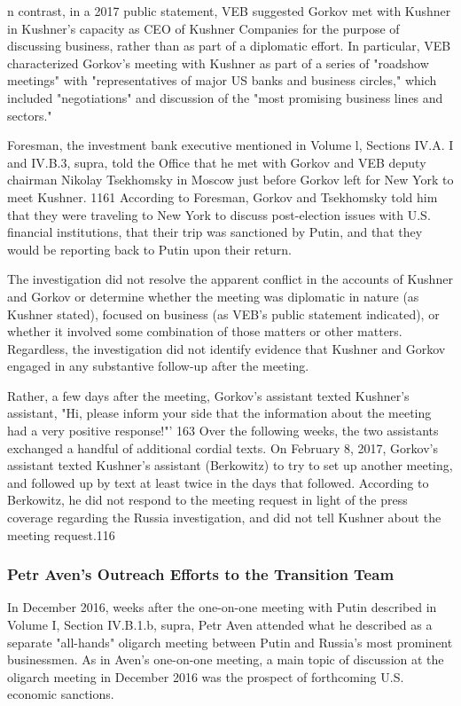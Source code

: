 n contrast, in a 2017 public statement, VEB suggested Gorkov met with Kushner in Kushner's capacity as CEO of Kushner Companies for the purpose of discussing business, rather than as part of a diplomatic effort. In particular, VEB characterized Gorkov's meeting with Kushner as part of a series of "roadshow meetings" with "representatives of major US banks and business circles," which included "negotiations" and discussion of the "most promising business lines and sectors."%

Foresman, the investment bank executive mentioned in Volume l, Sections IV.A. I and IV.B.3, supra, told the Office that he met with Gorkov and VEB deputy chairman Nikolay Tsekhomsky in Moscow just before Gorkov left for New York to meet Kushner. 1161 According to Foresman, Gorkov and Tsekhomsky told him that they were traveling to New York to discuss post-election issues with U.S. financial institutions, that their trip was sanctioned by Putin, and that they would be reporting back to Putin upon their return.%

The investigation did not resolve the apparent conflict in the accounts of Kushner and Gorkov or determine whether the meeting was diplomatic in nature (as Kushner stated), focused on business (as VEB's public statement indicated), or whether it involved some combination of those matters or other matters. Regardless, the investigation did not identify evidence that Kushner and Gorkov engaged in any substantive follow-up after the meeting.

Rather, a few days after the meeting, Gorkov's assistant texted Kushner's assistant, "Hi, please inform your side that the information about the meeting had a very positive response!"' 163 Over the following weeks, the two assistants exchanged a handful of additional cordial texts.%
On February 8, 2017, Gorkov's assistant texted Kushner's assistant (Berkowitz) to try to set up another meeting, and followed up by text at least twice in the days that followed.%
According to Berkowitz, he did not respond to the meeting request in light of the press coverage regarding the Russia investigation, and did not tell Kushner about the meeting request.116

\subsubsection{Petr Aven's Outreach Efforts to the Transition Team}

In December 2016, weeks after the one-on-one meeting with Putin described in Volume I, Section IV.B.1.b, supra, Petr Aven attended what he described as a separate "all-hands" oligarch meeting between Putin and Russia's most prominent businessmen.%
As in Aven's one-on-one meeting, a main topic of discussion at the oligarch meeting in December 2016 was the prospect of forthcoming U.S. economic sanctions.%

